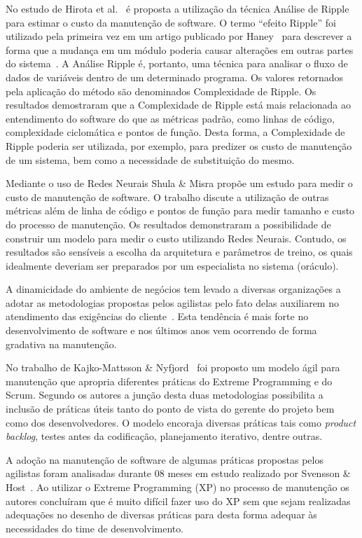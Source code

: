No estudo de Hirota et al.~\cite{hirota1994approach} é proposta a utilização da técnica Análise de Ripple para estimar o custo da manutenção de software. O termo ``efeito Ripple'' foi utilizado pela primeira vez em um artigo publicado por Haney~\cite{haney1972module} para descrever a forma que a mudança em um módulo poderia causar alterações em outras partes do sistema~\cite{bilal2005using}. A Análise Ripple é, portanto, uma técnica para analisar o fluxo de dados de variáveis dentro de um determinado programa. Os valores retornados pela aplicação do método são denominados Complexidade de Ripple. Os resultados demostraram que a Complexidade de Ripple está mais relacionada ao entendimento do
software do que as métricas padrão, como linhas de código, complexidade ciclomática e pontos de função. Desta forma, a Complexidade de Ripple poderia ser utilizada, por exemplo, para predizer os custo de manutenção de um sistema, bem como a necessidade de substituição do mesmo.

Mediante o uso de Redes Neurais Shula \& Misra
\cite{Shukla:2008:ESM:1342211.1342232} propõe um estudo para medir o custo de
manutenção de software. O trabalho discute a utilização de outras métricas além
de linha de código e pontos de função para medir  tamanho e custo do processo de manutenção. Os resultados demonstraram a possibilidade de construir um modelo para medir o custo utilizando Redes Neurais. Contudo, os resultados são sensíveis a escolha da arquitetura e parâmetros de treino, os quais idealmente deveriam ser preparados por um especialista no sistema (oráculo).


A dinamicidade do ambiente de negócios tem levado a diversas organizações a adotar as metodologias propostas pelos agilistas pelo fato delas auxiliarem no atendimento das exigências do cliente~\cite{Devulapally2015}. Esta tendência é mais forte no desenvolvimento de software e nos últimos anos vem ocorrendo de forma gradativa na manutenção. 

No trabalho de Kajko-Mattsson \& Nyfjord~\cite{4755767} foi proposto um modelo ágil para manutenção que apropria diferentes práticas do Extreme Programming e do Scrum. Segundo os autores a junção desta duas metodologias possibilita a inclusão de práticas úteis tanto do ponto de vista do gerente do projeto bem como dos desenvolvedores. O modelo encoraja diversas práticas tais como \textit{product backlog}, testes antes da codificação, planejamento iterativo, dentre outras.

A adoção na manutenção de software de algumas práticas propostas pelos agilistas foram analisadas durante 08 meses em estudo realizado por Svensson \& Host~\cite{1402140}. Ao utilizar o Extreme Programming (XP) no processo de manutenção os autores concluíram que é muito difícil fazer uso do XP sem que sejam realizadas adequações no desenho de diversas práticas para desta forma adequar às necessidades do time de desenvolvimento.

